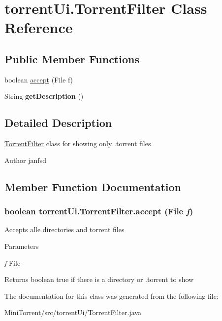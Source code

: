 \hypertarget{classtorrent_ui_1_1_torrent_filter}{
\section{torrentUi.TorrentFilter Class Reference}
\label{classtorrent_ui_1_1_torrent_filter}
}
\subsection*{Public Member Functions}
\begin{DoxyCompactItemize}
\item 
boolean \hyperlink{classtorrent_ui_1_1_torrent_filter_a136d8030183f4687b57ef405cc19edf0}{accept} (File f)
\item 
\hypertarget{classtorrent_ui_1_1_torrent_filter_a42c29b1d888bf4bc05529fa38520895e}{
String {\bfseries getDescription} ()}
\label{classtorrent_ui_1_1_torrent_filter_a42c29b1d888bf4bc05529fa38520895e}

\end{DoxyCompactItemize}


\subsection{Detailed Description}
\hyperlink{classtorrent_ui_1_1_torrent_filter}{TorrentFilter} class for showing only .torrent files \begin{DoxyAuthor}{Author}
janfsd 
\end{DoxyAuthor}


\subsection{Member Function Documentation}
\hypertarget{classtorrent_ui_1_1_torrent_filter_a136d8030183f4687b57ef405cc19edf0}{
\subsubsection[{accept}]{\setlength{\rightskip}{0pt plus 5cm}boolean torrentUi.TorrentFilter.accept (File {\em f})}}
\label{classtorrent_ui_1_1_torrent_filter_a136d8030183f4687b57ef405cc19edf0}
Accepts alle directories and torrent files 
\begin{DoxyParams}{Parameters}
\item[{\em f}]File \end{DoxyParams}
\begin{DoxyReturn}{Returns}
boolean true if there is a directory or .torrent to show 
\end{DoxyReturn}


The documentation for this class was generated from the following file:\begin{DoxyCompactItemize}
\item 
MiniTorrent/src/torrentUi/TorrentFilter.java\end{DoxyCompactItemize}
